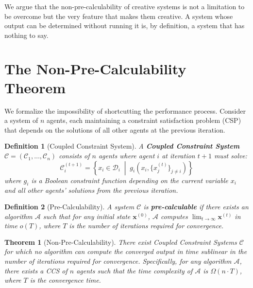 \documentclass[11pt,a4paper]{article}
\newtheorem{theorem}{Theorem}[section]
\newtheorem{definition}{Definition}[section]
\newcommand{\calC}{\mathcal{C}}
\begin{document}
We argue that the non-pre-calculability of creative systems is not a limitation to be overcome but the very feature that makes them creative. A system whose output can be determined without running it is, by definition, a system that has nothing to say.

\section{The Non-Pre-Calculability Theorem}\label{sec:theorem}

We formalize the impossibility of shortcutting the performance process. Consider a system of $n$ agents, each maintaining a constraint satisfaction problem (CSP) that depends on the solutions of all other agents at the previous iteration.

\begin{definition}[Coupled Constraint System]\label{def:ccs}
A \textbf{Coupled Constraint System} $\calC = (\calC_1, \ldots, \calC_n)$ consists of $n$ agents where agent $i$ at iteration $t+1$ must solve:
\begin{equation}\label{eq:coupled}
  \calC_i^{(t+1)} = \left\{ x_i \in \mathcal{D}_i \;\middle|\; g_i\!\left(x_i, \{x_j^{(t)}\}_{j \neq i}\right) \right\}
\end{equation}
where $g_i$ is a Boolean constraint function depending on the current variable $x_i$ and all other agents' solutions from the previous iteration.
\end{definition}

\begin{definition}[Pre-Calculability]\label{def:precalc}
A system $\calC$ is \textbf{pre-calculable} if there exists an algorithm $\mathcal{A}$ such that for any initial state $\mathbf{x}^{(0)}$, $\mathcal{A}$ computes $\lim_{t \to \infty} \mathbf{x}^{(t)}$ in time $o(T)$, where $T$ is the number of iterations required for convergence.
\end{definition}

\begin{theorem}[Non-Pre-Calculability]\label{thm:nonprecalc}
There exist Coupled Constraint Systems $\calC$ for which no algorithm can compute the converged output in time sublinear in the number of iterations required for convergence. Specifically, for any algorithm $\mathcal{A}$, there exists a CCS of $n$ agents such that the time complexity of $\mathcal{A}$ is $\Omega(n \cdot T)$, where $T$ is the convergence time.
\end{theorem}
\end{document}
